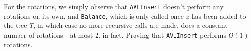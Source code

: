 \documentclass[11pt,english]{article}
\begin{document}
For the rotations, we simply observe that \texttt{AVLInsert} doesn't perform
any rotations on its own, and \texttt{Balance}, which is only called once $z$
has been added to the tree $T$, in which case no more recursive calls are made,
does a constant number of rotations - at most 2, in fact. Proving that
\texttt{AVLInsert} performs $O(1)$ rotations.








\end{document}
